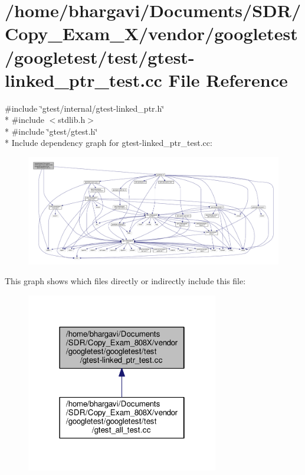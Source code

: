 \hypertarget{gtest-linked__ptr__test_8cc}{}\section{/home/bhargavi/\+Documents/\+S\+D\+R/\+Copy\+\_\+\+Exam\+\_\+X/vendor/googletest/googletest/test/gtest-\/linked\+\_\+ptr\+\_\+test.cc File Reference}
\label{gtest-linked__ptr__test_8cc}
{\ttfamily \#include \char`\"{}gtest/internal/gtest-\/linked\+\_\+ptr.\+h\char`\"{}}\\*
{\ttfamily \#include $<$stdlib.\+h$>$}\\*
{\ttfamily \#include \char`\"{}gtest/gtest.\+h\char`\"{}}\\*
Include dependency graph for gtest-\/linked\+\_\+ptr\+\_\+test.cc\+:
\nopagebreak
\begin{figure}[H]
\begin{center}
\leavevmode
\includegraphics[width=350pt]{gtest-linked__ptr__test_8cc__incl}
\end{center}
\end{figure}
This graph shows which files directly or indirectly include this file\+:
\nopagebreak
\begin{figure}[H]
\begin{center}
\leavevmode
\includegraphics[width=238pt]{gtest-linked__ptr__test_8cc__dep__incl}
\end{center}
\end{figure}

